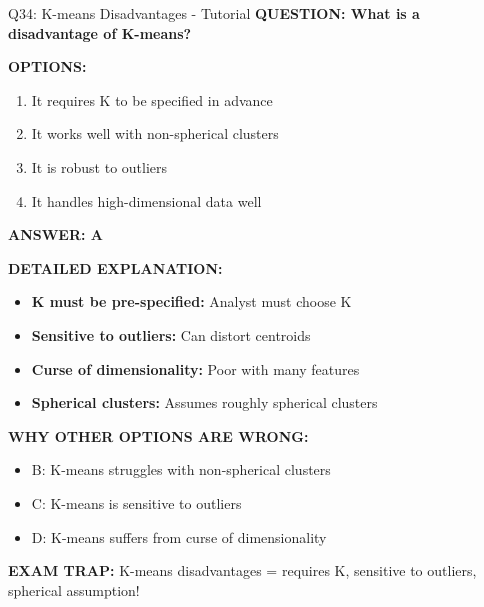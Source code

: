\documentclass[8pt]{beamer}
\begin{document}
	\begin{frame}{Q34: K-means Disadvantages - Tutorial}
		\fontsize{6.5}{7.5}\selectfont
		\textbf{QUESTION: What is a disadvantage of K-means?}
		
		\vspace{0.1cm}
		\textbf{OPTIONS:}
		\begin{enumerate}
			\item It requires K to be specified in advance
			\item It works well with non-spherical clusters
			\item It is robust to outliers
			\item It handles high-dimensional data well
		\end{enumerate}
		
		\vspace{0.1cm}
		\textcolor{myblue}{\textbf{ANSWER: A}}
		
		\vspace{0.1cm}
		\textbf{DETAILED EXPLANATION:}
		\begin{itemize}
			\item \textbf{K must be pre-specified:} Analyst must choose K
			\item \textbf{Sensitive to outliers:} Can distort centroids
			\item \textbf{Curse of dimensionality:} Poor with many features
			\item \textbf{Spherical clusters:} Assumes roughly spherical clusters
		\end{itemize}
		
		\vspace{0.1cm}
		\textcolor{myred}{\textbf{WHY OTHER OPTIONS ARE WRONG:}}
		\begin{itemize}
			\item \textcolor{myred}{B:} K-means struggles with non-spherical clusters
			\item \textcolor{myred}{C:} K-means is sensitive to outliers
			\item \textcolor{myred}{D:} K-means suffers from curse of dimensionality
		\end{itemize}
		
		\textcolor{myred}{\textbf{EXAM TRAP:}} K-means disadvantages = \textcolor{myblue}{requires K, sensitive to outliers, spherical assumption}!
	\end{frame}
	
\end{document}
